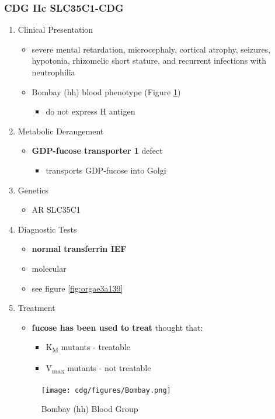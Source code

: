\documentclass[12pt]{scrartcl}
\begin{document}
\subsubsection{CDG IIc SLC35C1-CDG}
\label{sec:orgdc6d66f}
\begin{enumerate}
\item Clinical Presentation
\label{sec:orgc1cf1fd}
\begin{itemize}
\item severe mental retardation, microcephaly, cortical atrophy, seizures,
hypotonia, rhizomelic short stature, and recurrent infections with
neutrophilia
\item Bombay (hh) blood phenotype (Figure \ref{fig:org301e8a5})
\begin{itemize}
\item do not express H antigen
\end{itemize}
\end{itemize}
\item Metabolic Derangement
\label{sec:orgf389524}
\begin{itemize}
\item \textbf{GDP-fucose transporter 1} defect
\begin{itemize}
\item transports GDP-fucose into Golgi
\end{itemize}
\end{itemize}
\item Genetics
\label{sec:org7a4a022}
\begin{itemize}
\item AR SLC35C1
\end{itemize}

\item Diagnostic Tests
\label{sec:org6860b9c}
\begin{itemize}
\item \textbf{normal transferrin IEF}
\item molecular
\item see figure \ref{fig:orgae3a139}
\end{itemize}
\item Treatment
\label{sec:org5b72b34}
\begin{itemize}
\item \textbf{fucose has been used to treat} thought that:
\begin{itemize}
\item K\textsubscript{M} mutants - treatable
\item V\textsubscript{max} mutants - not treatable
\end{itemize}
\end{itemize}

\begin{figure}[htbp]
\centering
\texttt{[image: cdg/figures/Bombay.png]}
\caption[Hh]{\label{fig:org301e8a5}Bombay (hh) Blood Group}
\end{figure}
\end{enumerate}
\end{document}
